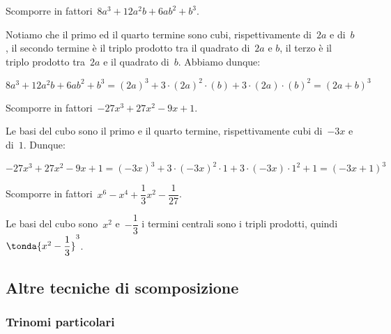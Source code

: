 \begin{esempio}{}{}
Scomporre in fattori~\(8a^{3}+12a^{2}b+6{ab}^{2}+b^{3}\).

Notiamo che il primo ed il quarto termine sono cubi, rispettivamente 
di~\(2a\) e di~\(b\), 
il secondo termine è il triplo prodotto tra il quadrato di~\(2a\) e 
\(b\), il terzo è il triplo prodotto tra~\(2a\) e il quadrato di~\(b\).
Abbiamo dunque:

\vspace{-1.5em}
\[8a^{3}+12a^{2}b+6ab^{2}+b^{3}=
  (2a)^{3}+3\cdot (2a)^{2}\cdot (b)+3\cdot (2a)\cdot (b)^{2}=
  (2a+b)^{3}\]
\end{esempio}

\begin{esempio}{}{}
Scomporre in fattori~\(-27x^3+27x^2-9x+1\).

Le basi del cubo sono il primo e il quarto termine, rispettivamente cubi 
di~\(-3x\) e di~\(1\).
Dunque:

\vspace{-1.5em}
\[-27x^3+27x^2-9x+1=
  (-3x)^{3}+3\cdot (-3x)^{2}\cdot 1+3\cdot (-3x)\cdot 
  1^{2}+1=(-3x+1)^{3}\]
\end{esempio}

\begin{esempio}{}{}
Scomporre in fattori~\(x^6-x^4+\dfrac{1}{3}x^2-\dfrac{1}{27}\).

Le basi del cubo sono~\(x^2\) e~\(-\dfrac{1}{3}\) i termini centrali 
sono i tripli prodotti, quindi~\(\tonda{x^2-\dfrac{1}{3}}^{3}\).
\end{esempio}





\subsection{Altre tecniche di scomposizione}
\label{subsec:divpol_altretecniche}

\subsubsection{Trinomi particolari}
\label{subsubsec:trinpart}

